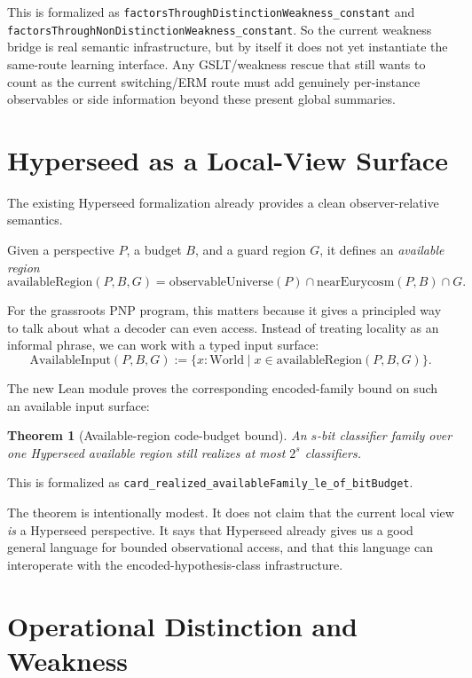 \documentclass[11pt]{article}
\newtheorem{theorem}{Theorem}[section]
\theoremstyle{remark}
\begin{document}
\noindent
This is formalized as
\texttt{factorsThroughDistinctionWeakness\_constant} and
\texttt{factorsThroughNonDistinctionWeakness\_constant}.  So the current
weakness bridge is real semantic infrastructure, but by itself it does not yet
instantiate the same-route learning interface.  Any GSLT/weakness rescue that
still wants to count as the current switching/ERM route must add genuinely
per-instance observables or side information beyond these present global
summaries.

\section{Hyperseed as a Local-View Surface}

The existing Hyperseed formalization already provides a clean observer-relative
semantics.

Given a perspective \(P\), a budget \(B\), and a guard region \(G\), it defines
an \emph{available region}
\[
  \mathrm{availableRegion}(P,B,G)
  =
  \mathrm{observableUniverse}(P)
  \cap
  \mathrm{nearEurycosm}(P,B)
  \cap
  G.
\]

For the grassroots PNP program, this matters because it gives a principled way to
talk about what a decoder can even access.  Instead of treating locality as an
informal phrase, we can work with a typed input surface:
\[
  \mathrm{AvailableInput}(P,B,G)
  := \{x : \mathrm{World} \mid x \in \mathrm{availableRegion}(P,B,G)\}.
\]

The new Lean module proves the corresponding encoded-family bound on such an
available input surface:

\begin{theorem}[Available-region code-budget bound]
An \(s\)-bit classifier family over one Hyperseed available region still realizes
at most \(2^s\) classifiers.
\end{theorem}

\noindent
This is formalized as
\texttt{card\_realized\_availableFamily\_le\_of\_bitBudget}.

The theorem is intentionally modest.  It does not claim that the current local
view \emph{is} a Hyperseed perspective.  It says that Hyperseed already gives us a
good general language for bounded observational access, and that this language can
interoperate with the encoded-hypothesis-class infrastructure.

\section{Operational Distinction and Weakness}
\end{document}
